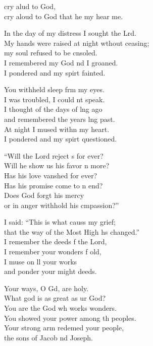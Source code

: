 \begin{psalmverse}
  \begin{patverse}
     cry alud to God,\Med\\
cry aloud to God that he my hear me.

In the day of my distress I sought the Lrd.\Flex\\
My hands were raised at night w\pointup{\i}thout ceasing;\Med\\
my soul refused to be cnsoled.\\
I remembered my God nd I groaned.\Med\\
I pondered and my spir\pointup{\i}t fainted.

You withheld sleep frm my eyes.\Med\\
I was troubled, I could nt speak.\\
I thought of the days of lng ago\Med\\
and remembered the years lng past.\\
At night I mused with\pointup{\i}n my heart.\Med\\
I pondered and my spir\pointup{\i}t questioned.

“Will the Lord reject s for ever?\Med\\
Will he show us his favor n more?\\
Has his love van\pointup{\i}shed for ever?\Med\\
Has his promise come to n end?\\
Does God forgt his mercy\Med\\
or in anger withhold his cmpassion?”

I said: “This is what causs my grief;\Med\\
that the way of the Most High hs changed.”\\
I remember the deeds f the Lord,\Med\\
I remember your wonders f old,\\
I muse on ll your works\Med\\
and ponder your might deeds.

Your ways, O Gd, are holy.\Med\\
What god is as great as ur God?\\
You are the God wh works wonders.\Med\\
You showed your power among th peoples.\\
Your strong arm redemed your people,\Med\\
the sons of Jacob nd Joseph.


\end{patverse}
\end{psalmverse}
